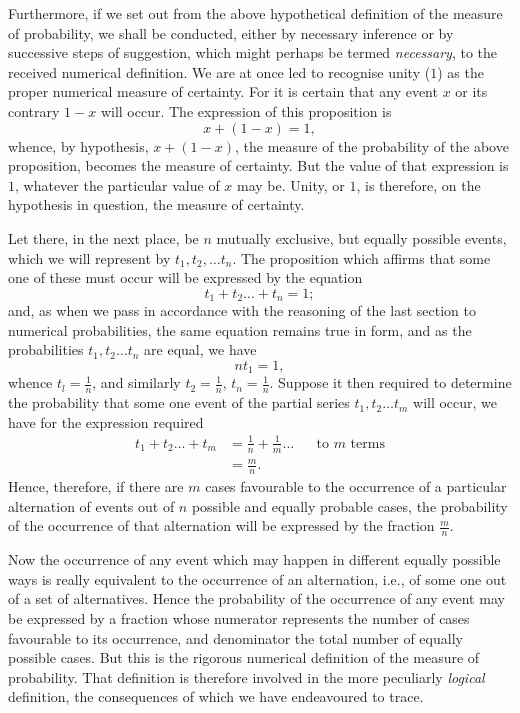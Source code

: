 \documentclass[oneside]{book}
\begin{document}
Furthermore, if we set out from the above hypothetical definition
of the measure of probability, we shall be conducted,
either by necessary inference or by successive steps of suggestion,
which might perhaps be termed \emph{necessary}, to the received numerical
definition. We are at once led to recognise unity ($1$)
as the proper numerical measure of certainty. For it is certain
that any event $x$ or its contrary $1-x$ will occur. The expression
of this proposition is
\[
  x + (1-x) = 1,
\]
whence, by hypothesis, $x + (1-x)$, the measure of the probability
of the above proposition, becomes the measure of certainty.
But the value of that expression is $1$, whatever the particular
value of $x$ may be. Unity, or $1$, is therefore, on the hypothesis
in question, the measure of certainty.

Let there, in the next place, be $n$ mutually exclusive, but
equally possible events, which we will represent by
$t_1, t_2, \dotsc t_n$.
The proposition which affirms that some one of these must occur
will be expressed by the equation
\[
  t_1 + t_2 \dotsc + t_n= 1;
\]
and, as when we pass in accordance with the reasoning of the
last section to numerical probabilities, the same equation remains
true in form, and as the probabilities $t_1, t_2 \dotsc t_n$ are equal, we
have
\[
  nt_1 = 1,
\]
whence $t_l = \frac{1}{n}$, and similarly $t_2 = \frac{1}{n}$,
$t_n = \frac{1}{n}$. Suppose it then required to determine the probability that some one event of the
partial series $t_1, t_2 \dotsc t_m$ will occur, we have for the expression
required
\begin{align*}
  t_1+t_2\dotsc+t_m &=\frac{1}{n}+\frac{1}{m}\dotsc&&\text{to $m$ terms}\\
                    &=\frac{m}{n}.
\end{align*}
Hence, therefore, if there are $m$ cases favourable to the occurrence
of a particular alternation of events out of $n$ possible and
equally probable cases, the probability of the occurrence of that
alternation will be expressed by the fraction $\frac{m}{n}$.

Now the occurrence of any event which may happen in different
equally possible ways is really equivalent to the occurrence
of an alternation, i.e., of some one out of a set of alternatives.
Hence the probability of the occurrence of any event may be
expressed by a fraction whose numerator represents the number
of cases favourable to its occurrence, and denominator the total
number of equally possible cases. But this is the rigorous numerical
definition of the measure of probability. That definition is
therefore involved in the more peculiarly \emph{logical} definition, the
consequences of which we have endeavoured to trace.
\end{document}
